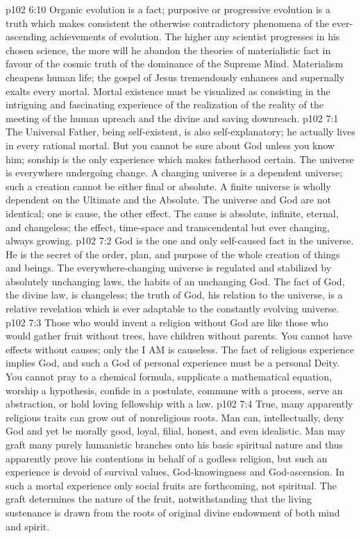 \vs p102 6:10 Organic evolution is a fact; purposive or progressive evolution is a truth which makes consistent the otherwise contradictory phenomena of the ever\hyp{}ascending achievements of evolution. The higher any scientist progresses in his chosen science, the more will he abandon the theories of materialistic fact in favour of the cosmic truth of the dominance of the Supreme Mind. Materialism cheapens human life; the gospel of Jesus tremendously enhances and supernally exalts every mortal. Mortal existence must be visualized as consisting in the intriguing and fascinating experience of the realization of the reality of the meeting of the human upreach and the divine and saving downreach.
\vs p102 7:1 The Universal Father, being self\hyp{}existent, is also self\hyp{}explanatory; he actually lives in every rational mortal. But you cannot be sure about God unless you know him; sonship is the only experience which makes fatherhood certain. The universe is everywhere undergoing change. A changing universe is a dependent universe; such a creation cannot be either final or absolute. A finite universe is wholly dependent on the Ultimate and the Absolute. The universe and God are not identical; one is cause, the other effect. The cause is absolute, infinite, eternal, and changeless; the effect, time\hyp{}space and transcendental but ever changing, always growing.
\vs p102 7:2 God is the one and only self\hyp{}caused fact in the universe. He is the secret of the order, plan, and purpose of the whole creation of things and beings. The everywhere\hyp{}changing universe is regulated and stabilized by absolutely unchanging laws, the habits of an unchanging God. The fact of God, the divine law, is changeless; the truth of God, his relation to the universe, is a relative revelation which is ever adaptable to the constantly evolving universe.
\vs p102 7:3 \pc Those who would invent a religion without God are like those who would gather fruit without trees, have children without parents. You cannot have effects without causes; only the I AM is causeless. The fact of religious experience implies God, and such a God of personal experience must be a personal Deity. You cannot pray to a chemical formula, supplicate a mathematical equation, worship a hypothesis, confide in a postulate, commune with a process, serve an abstraction, or hold loving fellowship with a law.
\vs p102 7:4 True, many apparently religious traits can grow out of nonreligious roots. Man can, intellectually, deny God and yet be morally good, loyal, filial, honest, and even idealistic. Man may graft many purely humanistic branches onto his basic spiritual nature and thus apparently prove his contentions in behalf of a godless religion, but such an experience is devoid of survival values, God\hyp{}knowingness and God\hyp{}ascension. In such a mortal experience only social fruits are forthcoming, not spiritual. The graft determines the nature of the fruit, notwithstanding that the living sustenance is drawn from the roots of original divine endowment of both mind and spirit.
